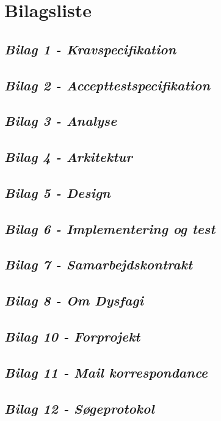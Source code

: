 \chapter{Bilagsliste}
\section*{\textit{Bilag 1 - Kravspecifikation}} \label{bilag1}
\section*{\textit{Bilag 2 - Accepttestspecifikation}} \label{bilag2}
\section*{\textit{Bilag 3 - Analyse}} \label{bilag3}
\section*{\textit{Bilag 4 - Arkitektur}} \label{bilag4}
\section*{\textit{Bilag 5 - Design}} \label{bilag5}
\section*{\textit{Bilag 6 - Implementering og test}} \label{bilag6}
\section*{\textit{Bilag 7 - Samarbejdskontrakt}} \label{bilag7}
\section*{\textit{Bilag 8 - Om Dysfagi}} \label{bilag8}
\section*{\textit{Bilag 10 - Forprojekt}} \label{bilag10}
\section*{\textit{Bilag 11 - Mail korrespondance}} \label{bilag11}
\section*{\textit{Bilag 12 - Søgeprotokol}} \label{bilag12}
